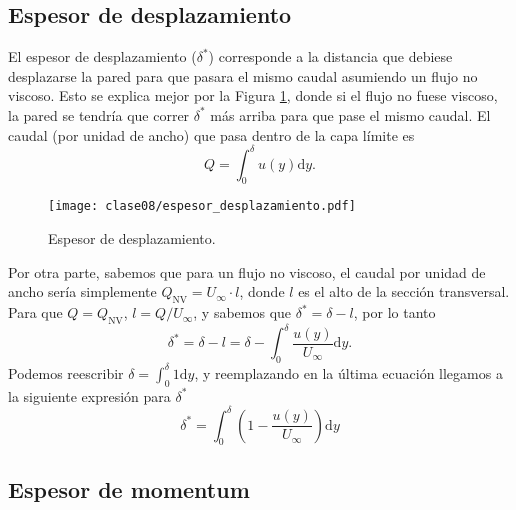 \subsection*{Espesor de desplazamiento}
El espesor de desplazamiento ($\delta^*$) corresponde a la distancia que debiese desplazarse la pared para que pasara el mismo caudal asumiendo un flujo no viscoso. 
Esto se explica mejor por la Figura \ref{fig:espesor_desplazamiento}, donde si el flujo no fuese viscoso, la pared se tendría que correr $\delta^*$ más arriba para que pase el mismo caudal.
El caudal (por unidad de ancho) que pasa dentro de la capa límite es
%
\begin{equation}
Q = \int_0^\delta u(y)\mathrm{d}y.
\end{equation}

\begin{figure}[!h]
\centering
\texttt{[image: clase08/espesor\_desplazamiento.pdf]}
\caption{Espesor de desplazamiento.}
\label{fig:espesor_desplazamiento}
\end{figure}

Por otra parte, sabemos que para un flujo no viscoso, el caudal por unidad de ancho sería simplemente $Q_\text{NV} = U_\infty \cdot l$, donde $l$ es el alto de la sección transversal.
Para que $Q=Q_\text{NV}$, $l=Q/U_\infty$, y sabemos que $\delta^*=\delta-l$, por lo tanto
%
\begin{equation}
\delta^* = \delta - l = \delta - \int_0^\delta \frac{u(y)}{U_\infty}\mathrm{d}y.
\end{equation}
%
Podemos reescribir $\delta = \int_0^\delta 1\mathrm{d}y$, y reemplazando en la última ecuación llegamos a la siguiente expresión para $\delta^*$
%
\begin{equation}\label{eq:espesor_desplazamiento}
\delta^* = \int_0^\delta \left(1-\frac{u(y)}{U_\infty}\right)\mathrm{d}y
\end{equation}

\subsection*{Espesor de momentum}
